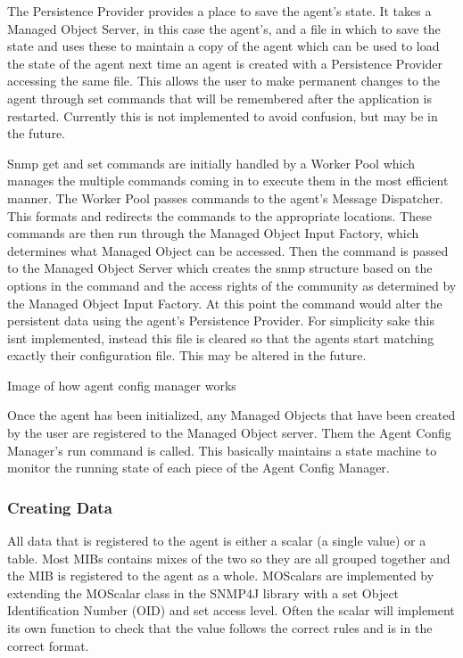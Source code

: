 \documentclass[12pt]{article}
\begin{document}
The Persistence Provider provides a place to save the agent's state. It takes a Managed Object Server, in this case the agent's, and a file in which to save the state and uses these to maintain a copy of the agent which can be used to load the state of the agent next time an agent is created with a Persistence Provider accessing the same file. This allows the user to make permanent changes to the agent through set commands that will be remembered after the application is restarted. Currently this is not implemented to avoid confusion, but may be in the future.

Snmp get and set commands are initially handled by a Worker Pool which manages the multiple commands coming in to execute them in the most efficient manner. The Worker Pool passes commands to the agent's Message Dispatcher. This formats and redirects the commands to the appropriate locations. These commands are then run through the Managed Object Input Factory, which determines what Managed Object can be accessed. Then the command is passed to the Managed Object Server which creates the snmp structure based on the options in the command and the access rights of the community as determined by the Managed Object Input Factory. At this point the command would alter the persistent data using the agent's Persistence Provider. For simplicity sake this isnt implemented, instead this file is  cleared so that the agents start matching exactly their configuration file. This may be altered in the future.

Image of how agent config manager works

Once the agent has been initialized, any Managed Objects that have been created by the user are registered to the Managed Object server. Them the Agent Config Manager's run command is called. This basically maintains a state machine to monitor the running state of each piece of the Agent Config Manager. 
\subsubsection{Creating Data}
All data that is registered to the agent is either a scalar (a single value) or a table. Most MIBs contains mixes of the two so they are all grouped together and the MIB is registered to the agent as a whole. MOScalars are implemented by extending the MOScalar class in the SNMP4J library with a set Object Identification Number (OID) and set access level. Often the scalar will implement its own function to check that the value follows the correct rules and is in the correct format.
\end{document}
